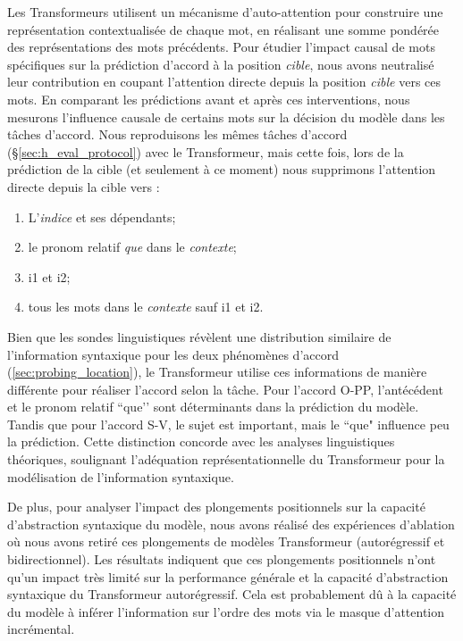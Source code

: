 Les Transformeurs utilisent un mécanisme d'auto-attention pour construire une représentation contextualisée de chaque mot, en réalisant une somme pondérée des représentations des mots précédents. Pour étudier l'impact causal de mots spécifiques sur la prédiction d'accord à la position \emph{cible}, nous avons neutralisé leur contribution en coupant l'attention directe depuis la position \emph{cible} vers ces mots. En comparant les prédictions avant et après ces interventions, nous mesurons l'influence causale de certains mots sur la décision du modèle dans les tâches d’accord. 
Nous reproduisons les mêmes tâches d'accord (\S\ref{sec:h_eval_protocol}) avec le Transformeur, mais cette fois, lors de la prédiction de la cible (et seulement à ce moment) nous supprimons l'attention directe depuis la cible vers :
\vspace{-0.8\baselineskip}
\begin{enumerate}[label=i\arabic*.]
    \item L'\emph{indice} et ses dépendants;
    \vspace{-0.5\baselineskip}
    \item le pronom relatif \textit{que} dans le \emph{contexte};
    \vspace{-0.5\baselineskip}
    \item i1 et i2;
    \vspace{-0.5\baselineskip}
    \item tous les mots dans le \emph{contexte} sauf i1 et i2.
\end{enumerate}
\vspace{-0.8\baselineskip}
Bien que les sondes linguistiques révèlent une distribution similaire de l’information syntaxique pour les deux phénomènes d’accord (\ref{sec:probing_location}), le Transformeur utilise ces informations de manière différente pour réaliser l'accord selon la tâche. Pour l’accord O-PP, l'antécédent et le pronom relatif ``que’’ sont déterminants dans la prédiction du modèle. Tandis que pour l'accord S-V, le sujet est important, mais le ``que" influence peu la prédiction. Cette distinction concorde avec les analyses linguistiques théoriques, soulignant l'adéquation représentationnelle du Transformeur pour la modélisation de l'information syntaxique.

De plus, pour analyser l’impact des plongements positionnels sur la capacité d’abstraction syntaxique du modèle, nous avons réalisé des expériences d'ablation où nous avons retiré ces plongements de modèles Transformeur (autorégressif et bidirectionnel). Les résultats indiquent que ces plongements positionnels n’ont qu’un impact très limité sur la performance générale et la capacité d'abstraction syntaxique du Transformeur autorégressif. Cela est probablement dû à la capacité du modèle à inférer l'information sur l'ordre des mots via le masque d'attention incrémental.

